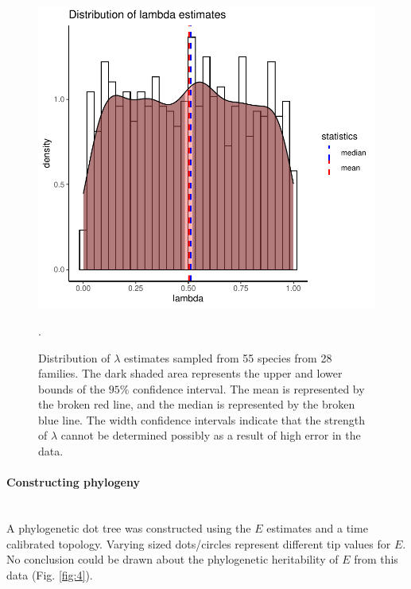 \documentclass[11pt]{article}
\begin{document}
\begin{flushleft}
\begin{figure}[!htbp]
    \centering
    \includegraphics[width=5in]{lambda_dist.pdf}
    \caption{\label{fig:3} Distribution of $\lambda$ estimates sampled from 55 species from 28 families. The dark shaded area represents the upper and lower bounds of the $95\%$ confidence interval. The mean is represented by the broken red line, and the median is represented by the broken blue line. The width confidence intervals indicate that the strength of $\lambda$ cannot be determined possibly as a result of high error in the data.}.
\end{figure}
\newpage

\paragraph{Constructing phylogeny}\mbox{}\\
A phylogenetic dot tree was constructed using the \emph{$E$} estimates and a time calibrated topology. Varying sized dots/circles represent different tip values for \emph{$E$}. No conclusion could be drawn about the phylogenetic heritability of \emph{$E$} from this data (Fig. \ref{fig:4}).
\linebreak


\end{flushleft}
\end{document}
